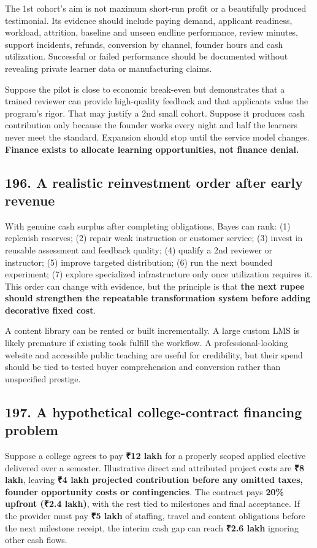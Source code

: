 The 1st cohort's aim is not maximum short-run profit or a beautifully produced testimonial. Its evidence should include paying demand, applicant readiness, workload, attrition, baseline and unseen endline performance, review minutes, support incidents, refunds, conversion by channel, founder hours and cash utilization. Successful or failed performance should be documented without revealing private learner data or manufacturing claims.

Suppose the pilot is close to economic break-even but demonstrates that a trained reviewer can provide high-quality feedback and that applicants value the program's rigor. That may justify a 2nd small cohort. Suppose it produces cash contribution only because the founder works every night and half the learners never meet the standard. Expansion should stop until the service model changes. \textbf{Finance exists to allocate learning opportunities, not finance denial.}

\subsection{196. A realistic reinvestment order after early revenue}


With genuine cash surplus after completing obligations, Bayes can rank: (1) replenish reserves; (2) repair weak instruction or customer service; (3) invest in reusable assessment and feedback quality; (4) qualify a 2nd reviewer or instructor; (5) improve targeted distribution; (6) run the next bounded experiment; (7) explore specialized infrastructure only once utilization requires it. This order can change with evidence, but the principle is that \textbf{the next rupee should strengthen the repeatable transformation system before adding decorative fixed cost}.

A content library can be rented or built incrementally. A large custom LMS is likely premature if existing tools fulfill the workflow. A professional-looking website and accessible public teaching are useful for credibility, but their spend should be tied to tested buyer comprehension and conversion rather than unspecified prestige.

\subsection{197. A hypothetical college-contract financing problem}


Suppose a college agrees to pay \textbf{₹12 lakh} for a properly scoped applied elective delivered over a semester. Illustrative direct and attributed project costs are \textbf{₹8 lakh}, leaving \textbf{₹4 lakh projected contribution before any omitted taxes, founder opportunity costs or contingencies}. The contract pays \textbf{20\% upfront (₹2.4 lakh)}, with the rest tied to milestones and final acceptance. If the provider must pay \textbf{₹5 lakh} of staffing, travel and content obligations before the next milestone receipt, the interim cash gap can reach \textbf{₹2.6 lakh} ignoring other cash flows.

